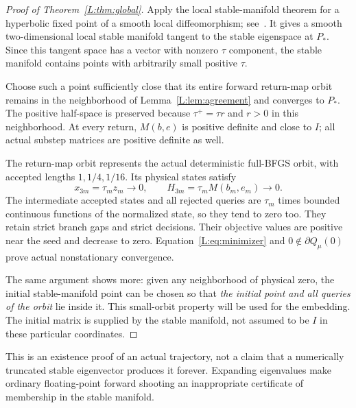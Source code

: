 \begin{proof}[Proof of Theorem~\ref{L:thm:global}]
Apply the local stable-manifold theorem for a hyperbolic fixed point of a smooth local diffeomorphism; see~\cite[Sections 3--4]{DY}. It gives a smooth two-dimensional local stable manifold tangent to the stable eigenspace at $P_*$. Since this tangent space has a vector with nonzero $\tau$ component, the stable manifold contains points with arbitrarily small positive $\tau$.

Choose such a point sufficiently close that its entire forward return-map orbit remains in the neighborhood of Lemma~\ref{L:lem:agreement} and converges to $P_*$. The positive half-space is preserved because $\tau^+=\tau r$ and $r>0$ in this neighborhood. At every return, $M(b,e)$ is positive definite and close to $I$; all actual substep matrices are positive definite as well.

The return-map orbit represents the actual deterministic full-BFGS orbit, with accepted lengths $1,1/4,1/16$. Its physical states satisfy
\[
 x_{3m}=\tau_m z_m\to0,\qquad H_{3m}=\tau_mM(b_m,e_m)\to0.
\]
The intermediate accepted states and all rejected queries are $\tau_m$ times bounded continuous functions of the normalized state, so they tend to zero too. They retain strict branch gaps and strict decisions. Their objective values are positive near the seed and decrease to zero. Equation~\eqref{L:eq:minimizer} and $0\notin\partial Q_\mu(0)$ prove actual nonstationary convergence.

The same argument shows more: given any neighborhood of physical zero, the initial stable-manifold point can be chosen so that \emph{the initial point and all queries of the orbit} lie inside it. This small-orbit property will be used for the embedding. The initial matrix is supplied by the stable manifold, not assumed to be $I$ in these particular coordinates.
\end{proof}
\noindent This is an existence proof of an actual trajectory, not a claim that a numerically truncated stable eigenvector produces it forever. Expanding eigenvalues make ordinary floating-point forward shooting an inappropriate certificate of membership in the stable manifold.


\setcounter{section}{4}
\setcounter{theorem}{2}
\setcounter{lemma}{1}
\setcounter{corollary}{0}
\setcounter{proposition}{0}
\setcounter{remark}{0}
\setcounter{equation}{7}


